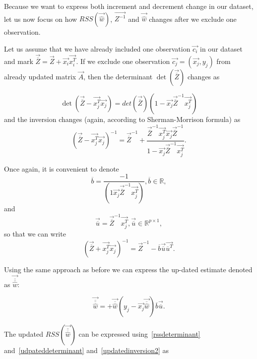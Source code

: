 Because we want to express both increment and decrement change in our dataset, let us now focus on how $RSS(\vec{\hat{w}})$, $\vec{Z^{-1}}$ and $\vec{\hat{w}}$  changes after we exclude one observation. 

Let us assume that we have already included one observation $\vec{c_i}$ in our dataset and mark $\vec{\overline{Z}} = \vec{Z} + \vec{x_i} \vec{x_i^T} $. If we exclude one observation $\vec{c_j} = (\vec{x_j}, y_j)$ from already updated matrix $\vec{A}$, then the determinant $\det(\vec{\overline{Z}})$  changes as

\begin{equation} 
    \det(\vec{\overline{Z}} - \vec{x_j^T}\vec{x_j}) = det(\vec{\overline{Z}})(1 - \vec{x_j}\vec{\overline{Z}}^{-1}\vec{x_j^T})
\end{equation}
and the inversion changes (again, according to Sherman-Morrison formula) as 
\begin{equation}  
    (\vec{\overline{Z}} - \vec{x_j^T}\vec{x_j})^{-1} = \vec{\overline{Z}}^{-1} + \dfrac{\vec{\overline{Z}}^{-1}\vec{x_j^T}\vec{x_j}\vec{\overline{Z}}^{-1}}{1 - \vec{x_j}\vec{\overline{Z}}^{-1}\vec{x_j^T}}.
\end{equation}

Once again, it is convenient to denote
\begin{equation}
    \overline{b} = \dfrac{-1}{(1  \vec{x_j}\vec{\overline{Z}}^{-1}\vec{x_j^T})},  \overline{b} \in \mathbb{R},
\end{equation}
and 
\begin{equation}
    \vec{\overline{u}} = \vec{\overline{Z}}^{-1}\vec{x_j^T},      \vec{\overline{u}} \in \mathbb{R}^{p \times 1},
\end{equation}
so that we can write
\begin{equation} \label{updatedinversion2}
    (\vec{\overline{Z}} + \vec{x_j^T}\vec{x_j})^{-1} = \vec{Z}^{-1} - \overline{b}\vec{\overline{u}}\vec{\overline{u}^T}.
\end{equation}

Using the same approach as before we can express the up-dated estimate denoted as $\vec{\overline{\overline{\hat{w}}}}$:

\begin{equation} \label{thetaminus}
    \vec{\overline{\overline{\hat{w}}}} =  +\vec{\overline{\hat{w}}} (y_j - \vec{x_j}\vec{\overline{\hat{w}}}) \overline{b} \vec{\overline{u}}.
\end{equation}

The updated $RSS(\vec{\overline{\overline{\hat{w}}}})$ can be expressed using~\eqref{rssdeterminant} and~\eqref{udpateddeterminant} and~\eqref{updatedinversion2} as 

